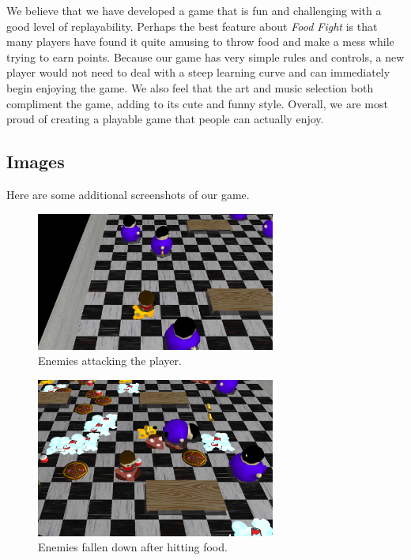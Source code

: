 \documentclass{article}
\begin{document}
We believe that we have developed a game that is fun and challenging with a good level of replayability. Perhaps the best feature about \textit{Food Fight} is that many players have found it quite amusing to throw food and make a mess while trying to earn points. Because our game has very simple rules and controls, a new player would not need to deal with a steep learning curve and can immediately begin enjoying the game. We also feel that the art and music selection both compliment the game, adding to its cute and funny style. Overall, we are most proud of creating a playable game that people can actually enjoy.

\subsection{Images}
Here are some additional screenshots of our game.

\begin{figure}[H]
  \centering
    \includegraphics[width=0.7\textwidth]{enemiesattacking}
    \caption{Enemies attacking the player.}    
\end{figure}

\begin{figure}[H]
  \centering
    \includegraphics[width=0.7\textwidth]{enemiesfallen}
    \caption{Enemies fallen down after hitting food.}    
\end{figure}
\end{document}
